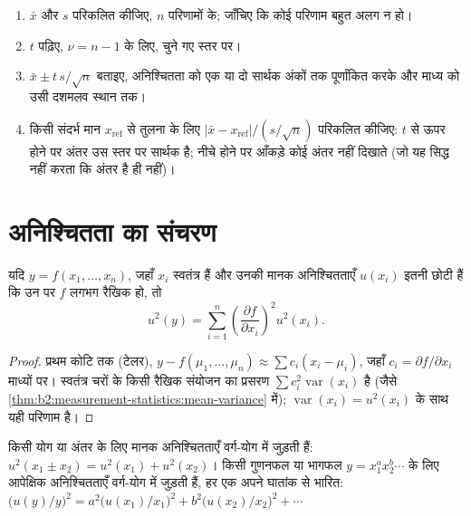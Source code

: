 \begin{method}[किसी माध्य के लिए विश्वास्यता अंतराल]\label{met:b2:measurement-statistics:confidence-interval}
\begin{enumerate}
  \item $\bar x$ और $s$ परिकलित कीजिए, $n$ परिणामों के; जाँचिए कि कोई परिणाम बहुत अलग न हो।
  \item $t$ पढ़िए, $\nu = n - 1$ के लिए, चुने गए स्तर पर।
  \item $\bar x \pm t\,s/\sqrt n$ बताइए, अनिश्चितता को एक या दो सार्थक अंकों तक पूर्णांकित करके
        और माध्य को उसी दशमलव स्थान तक।
  \item किसी संदर्भ मान $x_{\mathrm{ref}}$ से तुलना के लिए $|\bar x - x_{\mathrm{ref}}|/(s/\sqrt
        n)$ परिकलित कीजिए: $t$ से ऊपर होने पर अंतर उस स्तर पर सार्थक है; नीचे होने पर आँकड़े कोई
        अंतर नहीं दिखाते (जो यह सिद्ध नहीं करता कि अंतर है ही नहीं)।
\end{enumerate}
\end{method}

\section{अनिश्चितता का संचरण}

\begin{theorem}[अनिश्चितता संचरण का नियम]\label{thm:b2:measurement-statistics:propagation}
यदि $y = f(x_1, \dots, x_n)$, जहाँ $x_i$ स्वतंत्र हैं और उनकी मानक अनिश्चितताएँ $u(x_i)$ इतनी छोटी हैं
कि उन पर $f$ लगभग रैखिक हो, तो
\begin{equation*}
u^2(y) = \sum_{i=1}^{n}\left(\frac{\partial f}{\partial x_i}\right)^2 u^2(x_i).
\end{equation*}
\end{theorem}

\begin{proof}
प्रथम कोटि तक (टेलर), $y - f(\mu_1, \dots, \mu_n) \approx \sum c_i(x_i - \mu_i)$, जहाँ $c_i = \partial
f/\partial x_i$ माध्यों पर। स्वतंत्र चरों के किसी रैखिक संयोजन का प्रसरण
$\sum c_i^2\operatorname{var}(x_i)$ है (जैसे \cref{thm:b2:measurement-statistics:mean-variance} में);
$\operatorname{var}(x_i) = u^2(x_i)$ के साथ यही परिणाम है।
\end{proof}

\begin{corollary}[योग और गुणनफल]\label{cor:b2:measurement-statistics:products}
किसी योग या अंतर के लिए मानक अनिश्चितताएँ वर्ग-योग में जुड़ती हैं: $u^2(x_1 \pm x_2) = u^2(x_1) +
u^2(x_2)$। किसी गुणनफल या भागफल $y = x_1^{a}x_2^{b}\cdots$ के लिए आपेक्षिक अनिश्चितताएँ
वर्ग-योग में जुड़ती हैं, हर एक अपने घातांक से भारित: $\bigl(u(y)/y\bigr)^2 = a^2\bigl(u(x_1)/x_1\bigr)^2 +
b^2\bigl(u(x_2)/x_2\bigr)^2 + \cdots$
\end{corollary}

